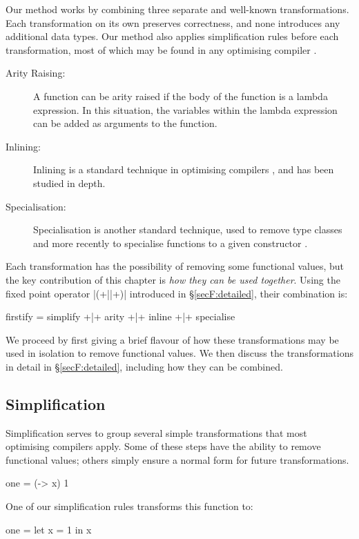 Our method works by combining three separate and well-known transformations. Each transformation on its own preserves correctness, and none introduces any additional data types. Our method also applies simplification rules before each transformation, most of which may be found in any optimising compiler \cite{spj:transformation}.

\begin{description}
\item[Arity Raising:] A function can be arity raised if the body of the function is a lambda expression. In this situation, the variables within the lambda expression can be added as arguments to the function.
\item[Inlining:] Inlining is a standard technique in optimising compilers \cite{spj:inlining}, and has been studied in depth.
\item[Specialisation:] Specialisation is another standard technique, used to remove type classes \cite{jones:dictionary_free} and more recently to specialise functions to a given constructor \cite{spj:specconstr}.
\end{description}

Each transformation has the possibility of removing some functional values, but the key contribution of this chapter is \textit{how they can be used together}. Using the fixed point operator |(+||+)| introduced in \S\ref{secF:detailed}, their combination is:

\begin{code}
firstify = simplify +|+ arity +|+ inline +|+ specialise
\end{code}

We proceed by first giving a brief flavour of how these transformations may be used in isolation to remove functional values. We then discuss the transformations in detail in \S\ref{secF:detailed}, including how they can be combined.

\subsection{Simplification}

Simplification serves to group several simple transformations that most optimising compilers apply. Some of these steps have the ability to remove functional values; others simply ensure a normal form for future transformations.

\begin{example}
\begin{code}
one = (\x -> x) 1
\end{code}

\noindent One of our simplification rules transforms this function to:

\begin{code}
one = let x = 1 in x
\end{code}
\end{example}

